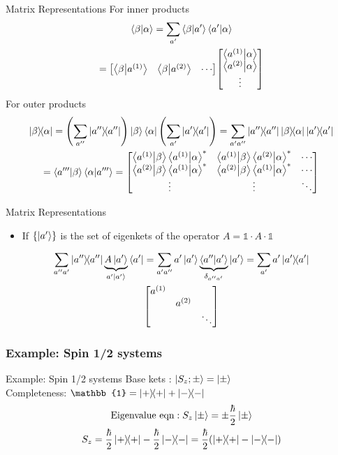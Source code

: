 \begin{frame}{Matrix Representations}
	For inner products
	\begin{gather*}
		\ip{\beta}{\alpha} = \sum_{a'} \ip{\beta}{a'}\ip{a'}{\alpha} \\
		= \mqty[ \ip{\beta}{a^{(1)}} & \ip{\beta}{a^{(2)}} & \cdots]
		\mqty[ \ip{a^{(1)}}{\alpha} \\
			\ip{a^{(2)}}{\alpha} \\
			\vdots]
		\\
	\end{gather*}
	For outer products
	\begin{gather*}
		\op{\beta}{\alpha} = \qty(\sum_{a''} \op{a''}) \ket\beta \bra{\alpha} \qty(\sum_{a'} \op{a'})=\sum_{a' a''} \op{a''}\op{\beta}{\alpha} \op{a'} \\
		= \ip{a'''}{\beta} \ip{\alpha}{a'''} = \mqty[
			\ip{a^{(1)}}{\beta}\ip{a^{(1)}}{\alpha}^* & \ip{a^{(1)}}{\beta}\ip{a^{(2)}}{\alpha}^* & \cdots \\
			\ip{a^{(2)}}{\beta}\ip{a^{(1)}}{\alpha}^* & \ip{a^{(2)}}{\beta}\ip{a^{(1)}}{\alpha}^* & \cdots \\
			\vdots & \vdots & \ddots
		]
	\end{gather*}
\end{frame}

\begin{frame}{Matrix Representations}
	\begin{itemize}
		\item If $\{\ket{a'}\}$ is the set of eigenkets of the operator $A = \mathbb{1}\cdot A \cdot \mathbb{1}$
	\end{itemize}
	\begin{gather*}
		\sum_{a'' a'} \op{a''} \underbrace{A\ket{a'}}_{a'\ket{a'}}\bra{a'} = \sum_{a' a''} a'\ket{a'}\underbrace{\ip{a''}{a'}}_{\delta_{a'' a'}} \ket{a'} = \sum_{a'} a'\op{a'}\\
		\mqty[\dmat{ a^{(1)},a^{(2)},\ddots }]
	\end{gather*}
\end{frame}

\subsubsection{Example: Spin 1/2 systems}
\begin{frame}{Example: Spin 1/2 systems}
	Base kets : $ \ket{S_z;\pm} = \ket{\pm}$\\
	Completeness: $\mathbb{1} = \op{+} + \op{-}$
	\begin{gather*}
		\text{Eigenvalue eqn}: S_z \ket{\pm} = \pm \frac\hbar2 \ket{\pm}\\
		S_z = \frac\hbar2 \op{+} - \frac{\hbar}{2}\op{-} = \frac{\hbar}{2} \qty(\op{+} - \op{-})
	\end{gather*}
\end{frame}

